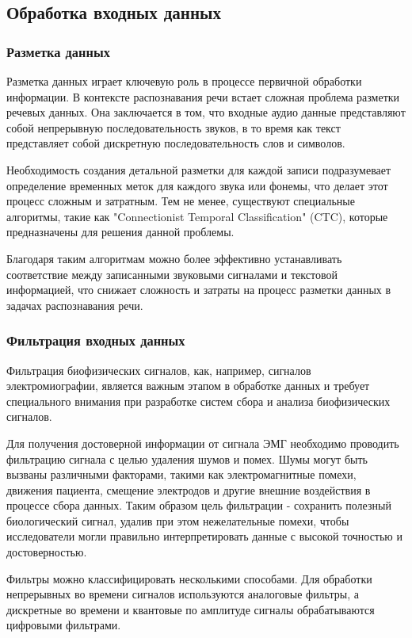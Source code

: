 \subsection{Обработка входных данных}

\subsubsection{Разметка данных}

Разметка данных играет ключевую роль в процессе первичной обработки информации. В контексте распознавания речи встает сложная проблема разметки речевых данных. Она заключается в том, что входные аудио данные представляют собой непрерывную последовательность звуков, в то время как текст представляет собой дискретную последовательность слов и символов.

Необходимость создания детальной разметки для каждой записи подразумевает определение временных меток для каждого звука или фонемы, что делает этот процесс сложным и затратным. Тем не менее, существуют специальные алгоритмы, такие как "Connectionist Temporal Classification" (CTC), которые предназначены для решения данной проблемы.

Благодаря таким алгоритмам можно более эффективно устанавливать соответствие между записанными звуковыми сигналами и текстовой информацией, что снижает сложность и затраты на процесс разметки данных в задачах распознавания речи.


\subsubsection{Фильтрация входных данных}


Фильтрация биофизических сигналов, как, например, сигналов электромиографии, является важным этапом в обработке данных и требует специального внимания при разработке систем сбора и анализа биофизических сигналов.

Для получения достоверной информации от сигнала ЭМГ необходимо проводить фильтрацию сигнала с целью удаления шумов и помех. Шумы могут быть вызваны различными факторами, такими как электромагнитные помехи, движения пациента, смещение электродов и другие внешние воздействия в процессе сбора данных. Таким образом цель фильтрации - сохранить полезный биологический сигнал, удалив при этом нежелательные помехи, чтобы исследователи могли правильно интерпретировать данные с высокой точностью и достоверностью.

Фильтры можно классифицировать несколькими способами. Для обработки непрерывных во времени сигналов используются аналоговые фильтры, а дискретные во времени и квантовые по амплитуде сигналы обрабатываются цифровыми фильтрами.

